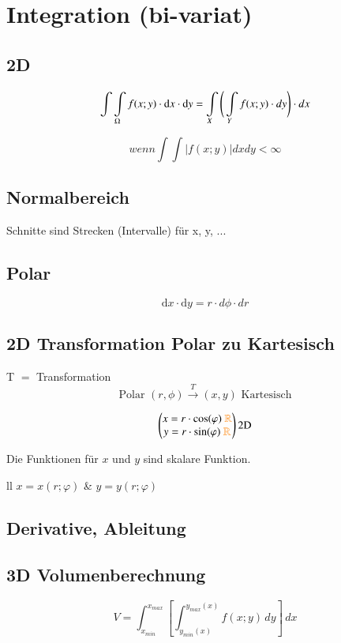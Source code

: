 \newpage
\section{Integration (bi-variat)}

\subsection{2D}

\[
    \int\int\limits_{\Omega}f(x;y)\cdot \mathop{} \! \mathrm{d} x\cdot \mathop{} \! \mathrm{d} y=\int\limits_{X}\Bigg(\int\limits_{Y}f(x;y)\cdot dy \Bigg)\cdot dx
\]

\[
    wenn\int\int|f(x;y)|dxdy<\infty
\]

\subsection{Normalbereich}

Schnitte sind Strecken (Intervalle) für x, y, ...

\subsection{Polar}

\[
    \text{d}x \cdot \text{d}y = r \cdot d\phi \cdot dr
\]

\subsection{2D Transformation Polar zu Kartesisch}
T $=$ Transformation
\[
    \text{Polar } (r,\phi) \xrightarrow{T} (x,y) \text{ Kartesisch}
\]

\[
\begin{pmatrix}
    x=r\cdot\cos(\varphi) \text{ } {\color{orange}\mathbb{R}} \\
    y=r\cdot\sin(\varphi) \text{ } {\color{orange}\mathbb{R}} 
\end{pmatrix}
\text{2D}
\]

Die Funktionen für $x$ und $y$ sind skalare Funktion.

    \begin{ctabular}{ll}
        $x=x(r;\varphi)$ & $ y=y(r;\varphi)$
    \end{ctabular}

\subsection{Derivative, Ableitung}


\subsection{3D Volumenberechnung}

$$V=\int_{x_{min}}^{x_{max}} \left[\int_{y_{min}(x)}^{y_{max}(x)} f\left(x;y\right)  \,dy \right] \,dx $$
\subsection{}
\subsection{}